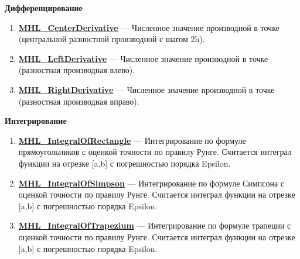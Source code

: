 \documentclass[a4paper,12pt]{article}
\begin{document}
\textbf{Дифференцирование}
\begin{enumerate}

\item \textbf{\hyperref[MHL_CenterDerivative]{MHL\_CenterDerivative}} --- Численное значение производной в точке (центральной разностной производной с шагом 2h).

\item \textbf{\hyperref[MHL_LeftDerivative]{MHL\_LeftDerivative}} --- Численное значение производной в точке (разностная производная влево).

\item \textbf{\hyperref[MHL_RightDerivative]{MHL\_RightDerivative}} --- Численное значение производной в точке (разностная производная вправо).

\end{enumerate}

\textbf{Интегрирование}
\begin{enumerate}

\item \textbf{\hyperref[MHL_IntegralOfRectangle]{MHL\_IntegralOfRectangle}} --- Интегрирование по формуле прямоугольников с оценкой точности по правилу Рунге. Считается интеграл функции на отрезке [a,b] с погрешностью порядка Epsilon.

\item \textbf{\hyperref[MHL_IntegralOfSimpson]{MHL\_IntegralOfSimpson}} --- Интегрирование по формуле Симпсона с оценкой точности по правилу Рунге. Считается интеграл функции на отрезке [a,b] с погрешностью порядка Epsilon.

\item \textbf{\hyperref[MHL_IntegralOfTrapezium]{MHL\_IntegralOfTrapezium}} --- Интегрирование по формуле трапеции с оценкой точности по правилу Рунге. Считается интеграл функции на отрезке [a,b] с погрешностью порядка Epsilon.

\end{enumerate}
\end{document}
